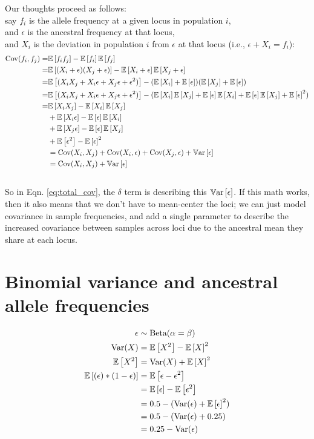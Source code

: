 \documentclass[12pt]{article}
\newcommand{\e}[1]{{\mathbb E}\left[ #1 \right]}
\newcommand{\var}[1]{{\mathbb V \textnormal{ar}}\left[ #1 \right]}
\begin{document}
Our thoughts proceed as follows:\\
say $f_i$ is the allele frequency at a given locus in population $i$,\\
and $\epsilon$ is the ancestral frequency at that locus,\\
and $X_i$ is the deviation in population $i$ from $\epsilon$ at that locus (i.e., $\epsilon + X_i = f_i$):\\
\begin{align}
\text{Cov}(f_i,f_j) =& \e{f_if_j} - \e{f_i}\e{f_j}	\notag\\
			=& \e{( X_i + \epsilon) ( X_j +
                         		 \epsilon)} - \e{  X_i+ \epsilon}\e{ X_j+ \epsilon} \notag\\
			=& \e{( X_i  X_j +  X_i\epsilon +  X_j\epsilon + \epsilon^2)} -(\e{ X_i}+ \e{\epsilon})(\e{ X_j}+ \e{\epsilon}) \notag\\
			=& \e{( X_i  X_j +  X_i\epsilon +  X_j\epsilon + \epsilon^2)} -
				(\e{ X_i}\e{ X_j}+ \e{\epsilon}\e{ X_i}+ \e{\epsilon}\e{ X_j} + \e{\epsilon}^2) \notag\\
			=& \e{X_i  X_j} - \e{ X_i}\e{ X_j} \\ \notag 
			     &+ \e{X_i\epsilon} - \e{\epsilon}\e{ X_i} \\ \notag 
			     &+\e{X_j\epsilon} - \e{\epsilon}\e{ X_j} \\ \notag 
			     &+\e{\epsilon^2} - \e{\epsilon}^2  \notag\\
			&= \text{Cov}({ X_i,X_j})  + \text{Cov}(X_i,\epsilon) + 
				\text{Cov}(X_j,\epsilon) + \var{\epsilon} \notag\\
			&= \text{Cov}({ X_i,X_j}) + \var{\epsilon}
\end{align}
\\

So in Eqn. \eqref{eq:total_cov}, the $\delta$ term is describing this $\var{\epsilon}$.
If this math works, then it also means that we don't have to mean-center the loci;
we can just model covariance in sample frequencies, 
and add a single parameter to describe the increased covariance between samples across loci 
due to the ancestral mean they share at each locus.

\newpage
\section*{Binomial variance and ancestral allele frequencies}
\begin{align}
\epsilon &\sim \text{Beta}(\alpha=\beta)\\\notag
\text{Var}(X) &= \e{X^2} - \e{X}^2\\\notag
\e{X^2} &= \text{Var}(X) + \e{X}^2\\\notag
\e{(\epsilon)*(1-\epsilon)} &= \e{\epsilon - \epsilon^2}\\\notag
&= \e{\epsilon} - \e{\epsilon^2}\\\notag
&= 0.5 -  (\text{Var}(\epsilon) + \e{\epsilon}^2)\\\notag
&= 0.5 -  (\text{Var}(\epsilon) + 0.25)\\\notag
&= 0.25 -  \text{Var}(\epsilon)\\\notag
\end{align}
\end{document}
